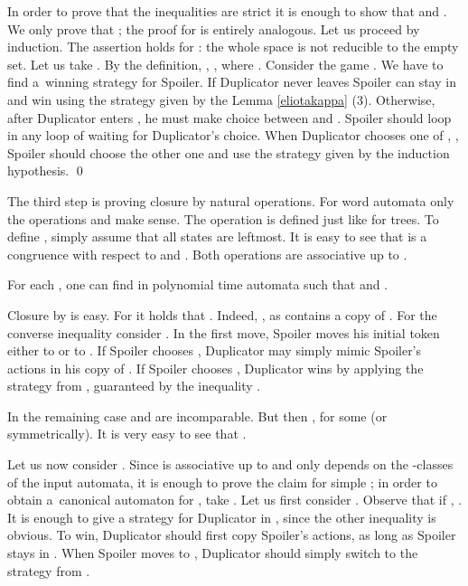 \documentclass{LMCS}
\begin{document}
In order to prove that the inequalities are strict it is enough to show that  and . We only prove that ; the proof for  is entirely analogous. Let us proceed by induction. The assertion holds for : the whole space is not reducible to the empty set. Let us take . By the definition, , , where .  Consider the game . We have to find a~winning strategy for Spoiler. If Duplicator never leaves  Spoiler can stay in  and win using the strategy given by the Lemma \ref{eliotakappa} (3). Otherwise, after Duplicator enters , he must make choice between  and . Spoiler should loop in any loop of  waiting for Duplicator's choice. When Duplicator chooses one of  , , Spoiler should choose the other one and use the strategy given by the induction hypothesis. \qed


\vspace{5pt}

The third step is proving closure by natural operations. For word automata only the operations  and  make sense. The operation  is defined just like for trees. To define , simply assume that all states are leftmost. It is easy to see that  is a congruence with respect to  and . Both operations are associative up to .

\begin{prop} \label{omegaclosure}
For each , one can find in polynomial time automata  such that  and .  
\end{prop}

\proof Closure by  is easy. For  it holds that . Indeed,  , as  contains a copy of . For the converse inequality consider . In the first move, Spoiler moves his initial token either to  or to . If Spoiler chooses , Duplicator may simply mimic Spoiler's actions in his copy of . If Spoiler chooses , Duplicator wins by applying the strategy from , guaranteed by the inequality . 

In the remaining case  and  are incomparable. But then ,   for some   (or symmetrically). It is very easy to see that . 

Let us now consider .  Since  is associative up to  and only depends on the -classes of the input automata, it is enough to prove the claim for simple ; in order to obtain a~canonical automaton for , take . Let us first consider .  Observe that if , . It is enough to give a strategy for Duplicator in , since the other inequality is obvious. To win, Duplicator should first copy Spoiler's actions, as long as Spoiler stays in . When Spoiler moves to , Duplicator should simply switch to the strategy from .
\end{document}
